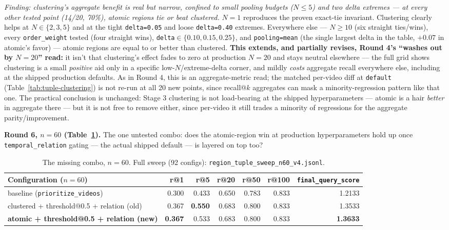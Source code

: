 \documentclass[11pt]{article}
\newcommand{\code}[1]{\texttt{\small #1}}
\newcommand{\file}[1]{\texttt{\footnotesize #1}}
\newcommand{\corr}[1]{\textbf{\textcolor{red!60!black}{#1}}}
\begin{document}
\emph{Finding: clustering's aggregate benefit is real but narrow, confined to small pooling budgets
($N\le5$) and two delta extremes --- at every other tested point (14/20, 70\%), atomic regions tie
or beat clustered.} $N=1$ reproduces the proven exact-tie invariant. Clustering clearly helps at
$N\in\{2,3,5\}$ and at the tight \code{delta=0.05} and loose \code{delta=0.40} extremes. Everywhere
else --- $N\ge10$ (six straight ties/wins), every \code{order\_weight} tested (four straight wins),
\code{delta}$\in\{0.10,0.15,0.25\}$, and \code{pooling=mean} (the single largest delta in the table,
$+0.07$ in atomic's favor) --- atomic regions are equal to or better than clustered.
\corr{This extends, and partially revises, Round 4's ``washes out by $N{=}20$'' read:} it isn't that
clustering's effect fades to zero at production $N{=}20$ and stays neutral elsewhere --- the full
grid shows clustering is a small \emph{positive} aid only in a specific low-$N$/extreme-delta
corner, and mildly \emph{costs} aggregate recall everywhere else, including at the shipped
production defaults. As in Round 4, this is an aggregate-metric read; the matched per-video diff at
\code{default} (Table~\ref{tab:tuple-clustering}) is not re-run at all 20 new points, since
recall@$k$ aggregates can mask a minority-regression pattern like that one. The practical conclusion
is unchanged: Stage 3 clustering is not load-bearing at the shipped hyperparameters --- atomic is a
hair \emph{better} in aggregate there --- but it is not free to remove either, since per-video it
still trades a minority of regressions for the aggregate parity/improvement.

\textbf{Round 6, $n=60$ (Table~\ref{tab:tuple-round6}).} The one untested combo: does the
atomic-region win at production hyperparameters hold up once \code{temporal\_relation} gating ---
the actual shipped default --- is layered on top too?

\begin{table}[h]
\centering\small
\begin{tabular}{@{}lrrrrrr@{}}
\toprule
Configuration ($n=60$) & r@1 & r@5 & r@20 & r@50 & r@100 & \code{final\_query\_score} \\
\midrule
baseline (\code{prioritize\_videos}) & 0.300 & 0.433 & 0.650 & 0.783 & 0.833 & 1.2133 \\
clustered + threshold@0.5 + relation (old) & 0.367 & \textbf{0.550} & 0.683 & 0.800 & 0.833 & 1.3533 \\
\textbf{atomic + threshold@0.5 + relation (new)} & \textbf{0.367} & 0.533 & 0.683 & 0.800 & 0.833 & \textbf{1.3633} \\
\bottomrule
\end{tabular}
\caption{The missing combo, $n=60$. Full sweep (92 configs): \file{region\_tuple\_sweep\_n60\_v4.jsonl}.}
\label{tab:tuple-round6}
\end{table}
\end{document}
